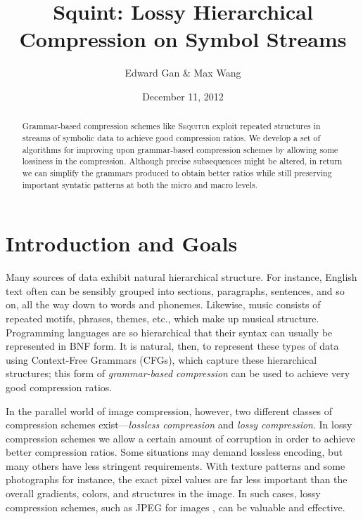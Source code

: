 \documentclass[11pt]{article}
\newcommand{\Sequitur}{\textsc{Sequitur}\xspace}
\begin{document}


\title{%
  \vspace{-.2in}%
  Squint: Lossy Hierarchical Compression on Symbol Streams%
  \vspace{-.1in}%
}
\author{Edward Gan \& Max Wang}
\date{%
  \vspace{-.1in}%
  December 11, 2012%
}

\maketitle

\begin{abstract}

Grammar-based compression schemes like \Sequitur exploit repeated structures in
streams of symbolic data to achieve good compression ratios.  We develop a set
of algorithms for improving upon grammar-based compression schemes by allowing
some lossiness in the compression.  Although precise subsequences might be
altered, in return we can simplify the grammars produced to obtain better
ratios while still preserving important syntatic patterns at both the micro and
macro levels.

\end{abstract}

\setcounter{tocdepth}{2}
\tableofcontents

\section{Introduction and Goals}

Many sources of data exhibit natural hierarchical structure.  For instance,
English text often can be sensibly grouped into sections, paragraphs,
sentences, and so on, all the way down to words and phonemes.  Likewise, music
consists of repeated motifs, phrases, themes, etc., which make up musical
structure.  Programming languages are so hierarchical that their syntax can
usually be represented in BNF form.  It is natural, then, to represent these
types of data using Context-Free Grammars (CFGs), which capture these
hierarchical structures; this form of \emph{grammar-based compression} can be
used to achieve very good compression ratios.

In the parallel world of image compression, however, two different classes of
compression schemes exist---\emph{lossless compression} and \emph{lossy
compression}.  In lossy compression schemes we allow a certain amount of 
corruption in order to achieve better
compression ratios.  Some situations may demand lossless encoding, but many others
have less stringent requirements. With texture
patterns and some photographs for instance, the exact pixel values are far less important
than the overall gradients, colors, and structures in the image.  In such
cases, lossy compression schemes, such as JPEG for images \cite{jpeg}, can be
valuable and effective.
\end{document}
